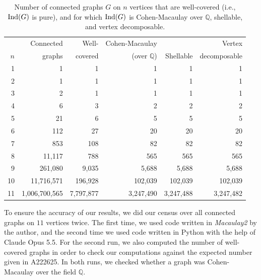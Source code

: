 \documentclass[10pt,a4paper]{amsart}
\theoremstyle{plain}
\theoremstyle{definition}
\theoremstyle{remark}
\numberwithin{equation}{section}
\numberwithin{equation}{section}
\begin{document}
\begin{table}[ht]
\centering
\begin{tabular}{@{}rrrrrr@{}}
\toprule
    & Connected & Well-     & Cohen-Macaulay      &           & Vertex        \\
$n$ & graphs    & covered   & (over $\mathbb{Q}$) & Shellable & decomposable  \\
\midrule
 1 &             1 &         1 &         1 &         1 &         1 \\
 2 &             1 &         1 &         1 &         1 &         1 \\
 3 &             2 &         1 &         1 &         1 &         1 \\
 4 &             6 &         3 &         2 &         2 &         2 \\
 5 &            21 &         6 &         5 &         5 &         5 \\
 6 &           112 &        27 &        20 &        20 &        20 \\
 7 &           853 &       108 &        82 &        82 &        82 \\
 8 &        11,117 &       788 &       565 &       565 &       565 \\
 9 &       261,080 &     9,035 &     5,688 &     5,688 &     5,688 \\
10 &    11,716,571 &   196,928 &   102,039 &   102,039 &   102,039 \\
\midrule
11 & 1,006,700,565 & 7,797,877 & 3,247,490 & 3,247,488 & 3,247,482 \\
\bottomrule
\end{tabular}
\caption{Number of connected graphs $G$ on $n$ vertices that are
well-covered (i.e., ${\rm Ind}(G)$ is pure), and for which ${\rm Ind}(G)$
is Cohen-Macaulay over $\mathbb{Q}$, shellable, and vertex decomposable.}\label{table}
\end{table}
 


To ensure the accuracy of our results, we did our census over all
connected graphs
on $11$ vertices twice. The first time, we used code 
written in {\it Macaulay2} \cite{M2} by the author, and the second
time we used code written in Python with the help of Claude Opus 5.5.  For the
second run, we also computed the number of well-covered graphs in
order to check our computations against the expected number given in
A222625.  In both runs, we checked whether a graph was Cohen-Macaulay over 
the field $\mathbb{Q}$.
\end{document}
